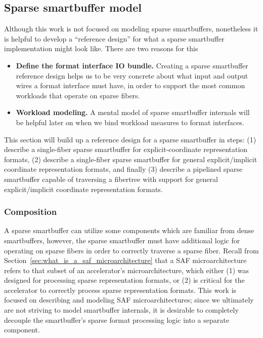 


\subsection{Sparse smartbuffer model}

Although this work is not focused on modeling sparse smartbuffers, nonetheless it is helpful to develop a ``reference design'' for what a sparse smartbuffer implementation might look like. There are two reasons for this

\begin{itemize}
    \item \textbf{Define the format interface IO bundle.} Creating a sparse smartbuffer reference design helps us to be very concrete about what input and output wires a format interface must have, in order to support the most common workloads that operate on sparse fibers.
    \item \textbf{Workload modeling.} A mental model of sparse smartbuffer internals will be helpful later on when we bind workload measures to format interfaces.
\end{itemize}

This section will build up a reference design for a sparse smartbuffer in steps: (1) describe a single-fiber sparse smartbuffer for explicit-coordinate representation formats, (2) describe a single-fiber sparse smartbuffer for general explicit/implicit coordinate representation formats, and finally (3) describe a pipelined sparse smartbuffer capable of traversing a fibertree with support for general explicit/implicit coordinate representation formats.

\subsubsection{Composition}
\label{sec:composition}

A sparse smartbuffer can utilize some components which are familiar from dense smartbuffers\cite{buffet}\cite{sparseloop}, however, the sparse smartbuffer must have additional logic for operating on sparse fibers in order to correctly traverse a sparse fiber. Recall from Section~\ref{sec:what_is_a_saf_microarchitecture} that a SAF microarchitecture refers to that subset of an accelerator's microarchitecture, which either (1) was designed for processing sparse representation formats, or (2) is critical for the accelerator to correctly process sparse representation formats. This work is focused on describing and modeling SAF microarchitectures; since we ultimately are not striving to model smartbuffer internals, it is desirable to completely decouple the smartbuffer's sparse format processing logic into a separate component.

